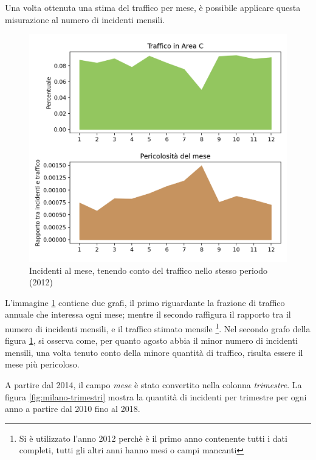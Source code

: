 \documentclass[a4paper]{report}
\begin{document}
Una volta ottenuta una stima del traffico per mese, è possibile applicare questa misurazione 
al numero di incidenti mensili.

\begin{figure}
    \includegraphics[width=\linewidth]{../src/area_c/rapporto_mese.png}
    \caption{Incidenti al mese, tenendo conto del traffico nello stesso periodo (2012)}
    \label{fig:incidenti-traffico-mese}
\end{figure}

L'immagine \ref{fig:incidenti-traffico-mese} contiene due grafi, 
il primo riguardante la frazione di traffico annuale che interessa ogni mese; 
mentre il secondo raffigura il rapporto tra il numero di incidenti mensili, e il traffico 
stimato mensile
\footnote{Si è utilizzato l'anno 2012 perchè è il primo anno contenente tutti i dati completi, 
tutti gli altri anni hanno mesi o campi mancanti}.
Nel secondo grafo della figura \ref{fig:incidenti-traffico-mese}, si osserva come, per quanto agosto 
abbia il minor numero di incidenti mensili, una volta tenuto conto della minore quantità di traffico, 
risulta essere il mese più pericoloso.

A partire dal 2014, il campo \textit{mese} è stato convertito nella colonna \textit{trimestre}.
La figura \ref{fig:milano-trimestri} mostra la quantità di incidenti per trimestre per ogni 
anno a partire dal 2010 fino al 2018.
\end{document}
